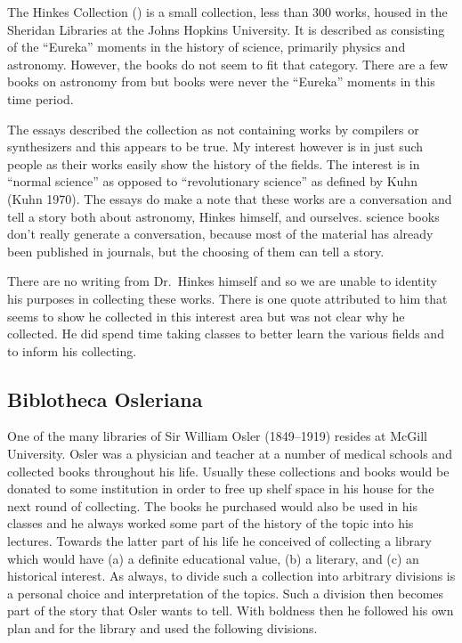\documentclass[letterpaper]{article}
\begin{document}
The Hinkes Collection (\cite{Havens2011}) is a small collection, less
than 300 works, housed in the Sheridan Libraries at the Johns Hopkins
University. It is described as consisting of the ``Eureka'' moments in
the history of science, primarily physics and astronomy. However,
the  books do not seem to fit that category. There are a few
books on astronomy from  but books were never the ``Eureka''
moments in this time period.

The essays described the collection as not containing works by
compilers or synthesizers and this appears to be true.  My interest
however is in just such people as their works easily show the history
of the fields.  The interest is in ``normal science'' as opposed to
``revolutionary science'' as defined by Kuhn (Kuhn 1970). The essays
do make a note that these works are a conversation and tell a story
both about astronomy, Hinkes himself, and ourselves.   science
books don't really generate a conversation, because most of the material
has already been published in journals, but the choosing of them
can tell a story.

There are no writing from Dr.~Hinkes himself and so we are unable to
identity his purposes in collecting these works.  There is one quote
attributed to him that seems to show he collected in this interest
area but was not clear why he collected.  He did spend time taking
classes to better learn the various fields and to inform his
collecting.


\subsection{Biblotheca Osleriana}

One of the many libraries of Sir William Osler (1849--1919) resides at
McGill University.  Osler was a physician and teacher at a number of
medical schools and collected books throughout his life.  Usually
these collections and books would be donated to some institution in
order to free up shelf space in his house for the next round of
collecting.  The books he purchased would also be used in his classes
and he always worked some part of the history of the topic into his
lectures.  Towards the latter part of his life he conceived of
collecting a library which would have (a) a definite educational
value, (b) a literary, and (c) an historical interest. As always, to
divide such a collection into arbitrary divisions is a personal choice
and interpretation of the topics.  Such a division then becomes part
of the story that Osler wants to tell.  With boldness then he followed
his own plan and for the library and used the following divisions.
\end{document}
